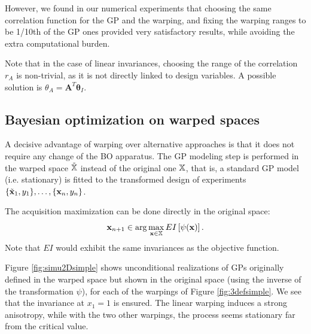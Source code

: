 However, we found in our numerical experiments that choosing the same correlation function for the GP and the warping, and fixing 
the warping ranges to be 1/10th of the GP ones provided very satisfactory results, while avoiding the extra computational burden.

Note that in the case of linear invariances, choosing the range of the correlation $r_A$ is non-trivial, as it is not directly linked to design variables. 
A possible solution is $\theta_A = \mathbf{A}^T \boldsymbol{\theta}_I$. 

\subsection{Bayesian optimization on warped spaces}
A decisive advantage of warping over alternative approaches is that it does not require any change of the BO apparatus.
The GP modeling step is performed in the warped space $\tilde {\mathbb{X}}$ instead of the original one $\mathbb{X}$, that is, 
a standard GP model (i.e. stationary) is fitted to the transformed design of experiments $\{\tilde {\mathbf{x}}_1, y_1\}, \ldots, \{\mathbf{x}_n, y_n\}$.

The acquisition maximization can be done directly in the original space:
\begin{equation}
 \mathbf{x}_{n+1} \in \arg \max_{\mathbf{x} \in \mathbb{X}} EI\left[ \psi(\mathbf{x}) \right].
\end{equation}
Note that $EI$ would exhibit the same invariances as the objective function.

Figure \ref{fig:simu2Dsimple} shows unconditional realizations of GPs originally defined in the warped space but shown in the original space (using the inverse
of the transformation $\psi$), for each of the warpings of Figure \ref{fig:3defsimple}. We see that the invariance at $x_1=1$ is ensured. 
The linear warping induces a strong anisotropy, while with the two other warpings,
the process seems stationary far from the critical value.

